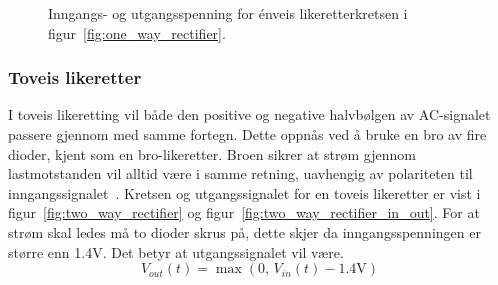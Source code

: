 \begin{figure}[H]
\centering
{}
\caption{Inngangs- og utgangsspenning for énveis likeretterkretsen i figur~\ref{fig:one_way_rectifier}.}
\label{fig:one_way_rectifier_in_out}
\end{figure}


\subsubsection{Toveis likeretter}\label{teo:toveis_likeretter}
I toveis likeretting vil både den positive og negative halvbølgen av AC-signalet passere gjennom med samme fortegn. Dette oppnås ved å bruke en bro av fire dioder, kjent som en bro-likeretter. Broen sikrer at strøm gjennom lastmotstanden vil alltid være i samme retning, uavhengig av polariteten til inngangssignalet~\cite{wikipediaRectifiers}. Kretsen og utgangssignalet for en toveis likeretter er vist i figur~\ref{fig:two_way_rectifier} og figur~\ref{fig:two_way_rectifier_in_out}. For at strøm skal ledes må to dioder skrus på, dette skjer da inngangsspenningen er større enn 1.4V. Det betyr at utgangssignalet vil være. 
\[
V_{out}(t) = \max \left(0, \, V_{in}(t) - 1.4\text{V}\right)
\]

